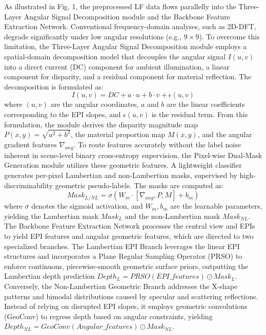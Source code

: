 As illustrated in Fig. 1, the preprocessed LF data flows parallelly into the Three-Layer Angular Signal Decomposition module and the Backbone Feature Extraction Network. Conventional frequency-domain analyses, such as 2D-DFT, degrade significantly under low angular resolutions (e.g., $9 \times 9$). To overcome this limitation, the Three-Layer Angular Signal Decomposition module employs a spatial-domain decomposition model that decouples the angular signal $I(u,v)$ into a direct current (DC) component for ambient illumination, a linear component for disparity, and a residual component for material reflection. The decomposition is formulated as:
\begin{equation}
\label{eq:eq1}
I(u,v) = DC + a \cdot u + b \cdot v + \epsilon(u,v)
\end{equation}
where $(u,v)$ are the angular coordinates, $a$ and $b$ are the linear coefficients corresponding to the EPI slopes, and $\epsilon(u,v)$ is the residual term. From this formulation, the module derives the disparity magnitude map $P(x,y) = \sqrt{a^2 + b^2}$, the material proportion map $M(x,y)$, and the angular gradient features $\nabla_{ang}$. To route features accurately without the label noise inherent in scene-level binary cross-entropy supervision, the Pixel-wise Dual-Mask Generation module utilizes these geometric features. A lightweight classifier generates per-pixel Lambertian and non-Lambertian masks, supervised by high-discriminability geometric pseudo-labels. The masks are computed as:
\begin{equation}
\label{eq:eq2}
Mask_{L/NL} = \sigma(W_m \cdot [\nabla_{ang}, P, M] + b_m)
\end{equation}
where $\sigma$ denotes the sigmoid activation, and $W_m, b_m$ are the learnable parameters, yielding the Lambertian mask $Mask_L$ and the non-Lambertian mask $Mask_{NL}$. The Backbone Feature Extraction Network processes the central view and EPIs to yield EPI features and angular geometric features, which are directed to two specialized branches. The Lambertian EPI Branch leverages the linear EPI structures and incorporates a Plane Regular Sampling Operator (PRSO) to enforce continuous, piecewise-smooth geometric surface priors, outputting the Lambertian depth prediction $Depth_L = PRSO(EPI\_features) \odot Mask_L$. Conversely, the Non-Lambertian Geometric Branch addresses the X-shape patterns and bimodal distributions caused by specular and scattering reflections. Instead of relying on disrupted EPI slopes, it employs geometric convolutions (GeoConv) to regress depth based on angular constraints, yielding $Depth_{NL} = GeoConv(Angular\_features) \odot Mask_{NL}$.

